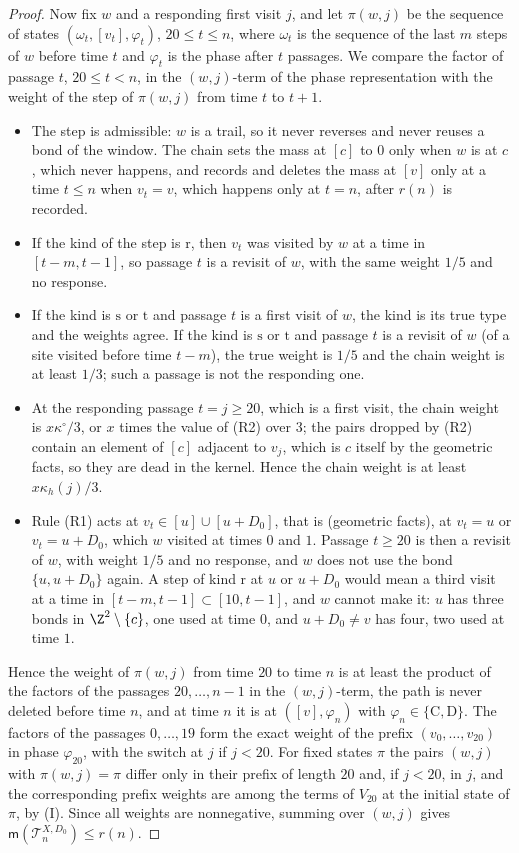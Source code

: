 \begin{proof}
Now fix $w$ and a responding first visit $j$, and let $\pi(w, j)$ be the sequence of states $(\omega_t, [v_t], \varphi_t)$, $20 \le t \le n$, where $\omega_t$ is the sequence of the last $m$ steps of $w$ before time $t$ and $\varphi_t$ is the phase after $t$ passages. We compare the factor of passage $t$, $20 \le t < n$, in the $(w, j)$-term of the phase representation with the weight of the step of $\pi(w, j)$ from time $t$ to $t + 1$.
\begin{itemize}
\item The step is admissible: $w$ is a trail, so it never reverses and never reuses a bond of the window. The chain sets the mass at $[c]$ to $0$ only when $w$ is at $c$, which never happens, and records and deletes the mass at $[v]$ only at a time $t \le n$ when $v_t = v$, which happens only at $t = n$, after $r(n)$ is recorded.
\item If the kind of the step is $\mathrm r$, then $v_t$ was visited by $w$ at a time in $[t - m, t - 1]$, so passage $t$ is a revisit of $w$, with the same weight $1/5$ and no response.
\item If the kind is $\mathrm s$ or $\mathrm t$ and passage $t$ is a first visit of $w$, the kind is its true type and the weights agree. If the kind is $\mathrm s$ or $\mathrm t$ and passage $t$ is a revisit of $w$ (of a site visited before time $t - m$), the true weight is $1/5$ and the chain weight is at least $1/3$; such a passage is not the responding one.
\item At the responding passage $t = j \ge 20$, which is a first visit, the chain weight is $x \kappa^\circ/3$, or $x$ times the value of (R2) over $3$; the pairs dropped by (R2) contain an element of $[c]$ adjacent to $v_j$, which is $c$ itself by the geometric facts, so they are dead in the kernel. Hence the chain weight is at least $x \kappa_h(j)/3$.
\item Rule (R1) acts at $v_t \in [u] \cup [u + D_0]$, that is (geometric facts), at $v_t = u$ or $v_t = u + D_0$, which $w$ visited at times $0$ and $1$. Passage $t \ge 20$ is then a revisit of $w$, with weight $1/5$ and no response, and $w$ does not use the bond $\{u, u + D_0\}$ again. A step of kind $\mathrm r$ at $u$ or $u + D_0$ would mean a third visit at a time in $[t - m, t - 1] \subset [10, t - 1]$, and $w$ cannot make it: $u$ has three bonds in $\Z^2 \setminus \{c\}$, one used at time $0$, and $u + D_0 \neq v$ has four, two used at time $1$.
\end{itemize}
Hence the weight of $\pi(w, j)$ from time $20$ to time $n$ is at least the product of the factors of the passages $20, \dots, n - 1$ in the $(w, j)$-term, the path is never deleted before time $n$, and at time $n$ it is at $([v], \varphi_n)$ with $\varphi_n \in \{\mathrm C, \mathrm D\}$. The factors of the passages $0, \dots, 19$ form the exact weight of the prefix $(v_0, \dots, v_{20})$ in phase $\varphi_{20}$, with the switch at $j$ if $j < 20$. For fixed states $\pi$ the pairs $(w, j)$ with $\pi(w, j) = \pi$ differ only in their prefix of length $20$ and, if $j < 20$, in $j$, and the corresponding prefix weights are among the terms of $V_{20}$ at the initial state of $\pi$, by (I). Since all weights are nonnegative, summing over $(w, j)$ gives $\mathsf m(\mathcal T^{X, D_0}_n) \le r(n)$.

\end{proof}
